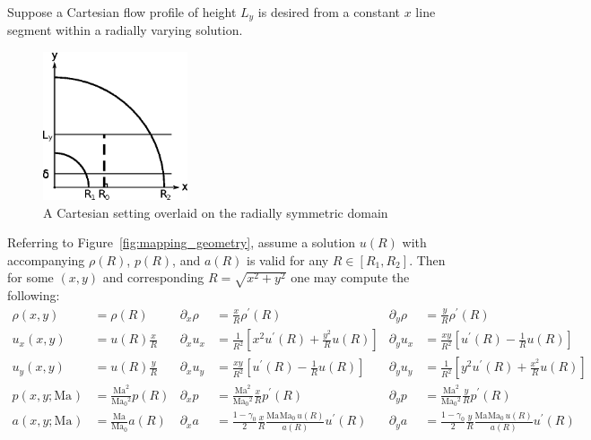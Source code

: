 \documentclass[letterpaper,11pt,nointlimits,reqno]{amsart}
\newcommand{\Mach}[1][]{\mbox{Ma}_{#1}}
\begin{document}
Suppose a Cartesian flow profile of height $L_y$ is desired from a constant $x$
line segment within a radially varying solution.
%
\begin{figure}[h]
  \centering
  \includegraphics[width=0.38\textwidth]{nozzle_schematic}
  \caption{
      \label{fig:mapping_geometry}
      A Cartesian setting overlaid on the radially symmetric domain
  }
\end{figure}
%
Referring to Figure~\eqref{fig:mapping_geometry}, assume a solution
$u\!\left(R\right)$ with accompanying $\rho\!\left(R\right)$,
$p\!\left(R\right)$, and $a\!\left(R\right)$ is valid for any
$R\in\left[R_1,R_2\right]$.  Then for some $\left(x,y\right)$ and corresponding
$R=\sqrt{x^2+y^2}$ one may compute the following:
%
\begin{align}
              \rho \!\left(x, y\right)        &= \rho\!\left(R\right)
 & \partial_x \rho                            &= \frac{x}{R} \rho^\prime\!\left(R\right)
 & \partial_y \rho                            &= \frac{y}{R} \rho^\prime\!\left(R\right)
\\            u_x  \!\left(x, y\right)        &= u   \!\left(R\right) \frac{x}{R}
 & \partial_x u_x                             &= \frac{1}{R^2}\left[x^2 u^\prime\!\left(R\right) + \frac{y^2}{R} u\!\left(R\right)\right]
 & \partial_y u_x                             &= \frac{xy}{R^2}\left[u^\prime\!\left(R\right) - \frac{1}{R}u\!\left(R\right)\right]
\\            u_y  \!\left(x, y\right)        &= u   \!\left(R\right) \frac{y}{R}
 & \partial_x u_y                             &= \frac{xy}{R^2}\left[u^\prime\!\left(R\right) - \frac{1}{R}u\!\left(R\right)\right]
 & \partial_y u_y                             &= \frac{1}{R^2}\left[y^2 u^\prime\!\left(R\right) + \frac{x^2}{R} u\!\left(R\right)\right]
\\            p    \!\left(x, y; \Mach\right) &= \frac{\Mach^2}{\Mach[0]{}^2} p   \!\left(R\right)
 & \partial_x p                               &= \frac{\Mach^2}{\Mach[0]{}^2}\frac{x}{R} p^\prime\!\left(R\right)
 & \partial_y p                               &= \frac{\Mach^2}{\Mach[0]{}^2}\frac{y}{R} p^\prime\!\left(R\right)
\\            a    \!\left(x, y; \Mach\right) &= \frac{\Mach  }{\Mach[0]{}  } a   \!\left(R\right)
 & \partial_x a                               &= \frac{1-\gamma_0}{2}\frac{x}{R}\frac{\Mach{}\Mach[0]{}\,u\!\left(R\right)}{a\!\left(R\right)} u^\prime\!\left(R\right)
 & \partial_y a                               &= \frac{1-\gamma_0}{2}\frac{y}{R}\frac{\Mach{}\Mach[0]{}\,u\!\left(R\right)}{a\!\left(R\right)} u^\prime\!\left(R\right)
\end{align}
\end{document}
